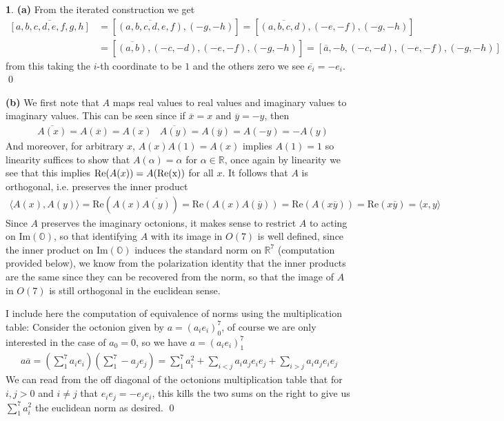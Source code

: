 \documentclass[10.5pt]{article}
\theoremstyle{definition}
\newtheorem{pb}{}
\newcommand{\gen}[1]{\langle#1\rangle}
\newcommand{\tand}{\text{ and }}
\begin{document}
    \begin{pb}
        \textbf{(a)} From the iterated construction we get
        \begin{align*}
            \overline{[a,b,c,d,e,f,g,h]} &= [\overline{(a,b,c,d,e,f)},(-g,-h)] = [\overline{(a,b,c,d)},(-e,-f),(-g,-h)] \\
            &= [\overline{(a,b)},(-c,-d),(-e,-f),(-g,-h)] = [\overline{a}, -b, (-c,-d),(-e,-f),(-g,-h)]
        \end{align*}
        from this taking the \(i\)-th coordinate to be \(1\) and the others zero we see \(\overline{e_i} = -e_i\). \qed

        \textbf{(b)} We first note that \(A\) maps real values to real values and imaginary values to imaginary values. This can be seen since if \(\overline{x} = x \tand \overline{y} = -y\), then
        \begin{align*}
            &\overline{A(x)} = A(\overline{x}) = A(x) &\overline{A(y)} = A(\overline{y}) = A(-y) = -A(y)
        \end{align*}
        And moreover, for arbitrary \(x\), \(A(x)A(1) = A(x)\) implies \(A(1) = 1\) so linearity suffices to show that \(A(\alpha) = \alpha\) for \(\alpha \in \mathbb{R}\), once again by linearity we see that this implies \(\text{Re}(A(x)) = A(\text{\text{Re}(x)})\) for all \(x\). It follows that \(A\) is orthogonal, i.e. preserves the inner product
        \begin{align*}
            \gen{A (x), A(y)} = \text{Re}(A(x)\overline{A(y)}) = \text{Re}(A(x)A(\overline{y})) = \text{Re}(A(x \overline{y})) = \text{Re}(x \overline{y}) = \gen{x,y}
        \end{align*}
        Since \(A\) preserves the imaginary octonions, it makes sense to restrict \(A\) to acting on \(\text{Im}(\mathbb{O})\), so that identifying \(A\) with its image in \(O(7)\) is well defined, since the inner product on \(\text{Im}(\mathbb{O})\) induces the standard norm on \(\mathbb{R}^7\) (computation provided below), we know from the polarization identity that the inner products are the same since they can be recovered from the norm, so that the image of \(A\) in \(O(7)\) is still orthogonal in the euclidean sense.

        I include here the computation of equivalence of norms using the multiplication table:
        Consider the octonion given by \(a = (a_ie_i)_0^7\), of course we are only interested in the case of \(a_0 = 0\), so we have \(a = (a_ie_i)_1^7\)
        \begin{align*}
            a \overline{a} = \left(\sum_1^7 a_i e_i\right)\left(\sum_1^7-a_je_j\right) = \sum_1^7 a_i^2 + \sum_{i < j} a_ia_j e_ie_j + \sum_{i > j}a_ia_j e_ie_j
        \end{align*}
        We can read from the off diagonal of the octonions multiplication table that for \(i,j > 0\) and \(i \neq j\) that \(e_ie_j = -e_je_i\), this kills the two sums on the right to give us \(\sum_1^7 a_i^2\) the euclidean norm as desired. \qed


\end{pb}
\end{document}
